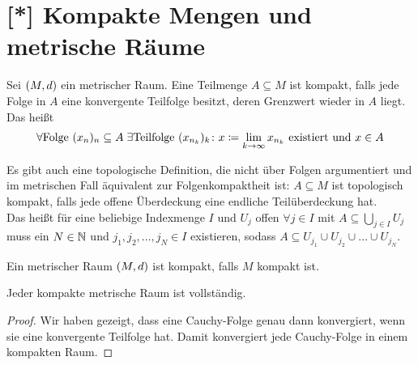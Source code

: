 \section{[*] Kompakte Mengen und metrische Räume}
\thispagestyle{pagenumberonly}

\begin{definition}[Kompaktheit]
    Sei $\left(M, d\right)$ ein metrischer Raum. Eine Teilmenge $A\subseteq M$ ist kompakt, falls jede Folge in $A$ eine konvergente Teilfolge besitzt, deren Grenzwert wieder in $A$ liegt. Das heißt
    \begin{align*}
        \forall \text{Folge } (x_n)_n\subseteq A\;\exists\text{Teilfolge } (x_{n_k})_k\colon x\coloneqq \lim_{k\rightarrow{}\infty} x_{n_k}\text{ existiert und }x\in A
    \end{align*}
\end{definition}

\begin{bemerkung}
    Es gibt auch eine topologische Definition, die nicht über Folgen argumentiert und im metrischen Fall äquivalent zur Folgenkompaktheit ist: $A\subseteq M$ ist topologisch kompakt, falls jede offene Überdeckung eine endliche Teilüberdeckung hat.\\
    Das heißt für eine beliebige Indexmenge $I$ und $U_j$ offen $\forall j\in I$ mit $A\subseteq \bigcup_{j\in I} U_j$ muss ein $N\in\mathbb{N}$ und $j_1, j_2, \ldots, j_N \in I$ existieren, sodass $A \subseteq U_{j_1} \cup U_{j_2} \cup \dots \cup U_{j_N}$.
\end{bemerkung}

\begin{definition}
    Ein metrischer Raum $\left(M, d\right)$ ist kompakt, falls $M$ kompakt ist.
\end{definition}

\begin{bemerkung}
    Jeder kompakte metrische Raum ist vollständig.
    \begin{proof}
        Wir haben gezeigt, dass eine Cauchy-Folge genau dann konvergiert, wenn sie eine konvergente Teilfolge hat. Damit konvergiert jede Cauchy-Folge in einem kompakten Raum.
    \end{proof}
\end{bemerkung}

